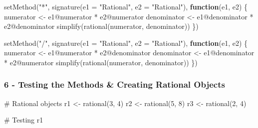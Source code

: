 \documentclass[
  12pt,
]{article}
\newenvironment{Shaded}{\begin{snugshade}}{\end{snugshade}}
\newcommand{\AttributeTok}[1]{\textcolor[rgb]{0.40,0.45,0.13}{#1}}
\newcommand{\CommentTok}[1]{\textcolor[rgb]{0.37,0.37,0.37}{#1}}
\newcommand{\ControlFlowTok}[1]{\textcolor[rgb]{0.00,0.23,0.31}{\textbf{#1}}}
\newcommand{\DecValTok}[1]{\textcolor[rgb]{0.68,0.00,0.00}{#1}}
\newcommand{\FunctionTok}[1]{\textcolor[rgb]{0.28,0.35,0.67}{#1}}
\newcommand{\NormalTok}[1]{\textcolor[rgb]{0.00,0.23,0.31}{#1}}
\newcommand{\OtherTok}[1]{\textcolor[rgb]{0.00,0.23,0.31}{#1}}
\newcommand{\SpecialCharTok}[1]{\textcolor[rgb]{0.37,0.37,0.37}{#1}}
\newcommand{\StringTok}[1]{\textcolor[rgb]{0.13,0.47,0.30}{#1}}
\begin{document}
\begin{Shaded}
\begin{Highlighting}[]
\FunctionTok{setMethod}\NormalTok{(}\StringTok{"*"}\NormalTok{, }\FunctionTok{signature}\NormalTok{(}\AttributeTok{e1 =} \StringTok{"Rational"}\NormalTok{, }\AttributeTok{e2 =} \StringTok{"Rational"}\NormalTok{), }\ControlFlowTok{function}\NormalTok{(e1, e2) \{}
\NormalTok{  numerator }\OtherTok{\textless{}{-}}\NormalTok{ e1}\SpecialCharTok{@}\NormalTok{numerator }\SpecialCharTok{*}\NormalTok{ e2}\SpecialCharTok{@}\NormalTok{numerator}
\NormalTok{  denominator }\OtherTok{\textless{}{-}}\NormalTok{ e1}\SpecialCharTok{@}\NormalTok{denominator }\SpecialCharTok{*}\NormalTok{ e2}\SpecialCharTok{@}\NormalTok{denominator}
  \FunctionTok{simplify}\NormalTok{(}\FunctionTok{rational}\NormalTok{(numerator, denominator))}
\NormalTok{\})}

\FunctionTok{setMethod}\NormalTok{(}\StringTok{"/"}\NormalTok{, }\FunctionTok{signature}\NormalTok{(}\AttributeTok{e1 =} \StringTok{"Rational"}\NormalTok{, }\AttributeTok{e2 =} \StringTok{"Rational"}\NormalTok{), }\ControlFlowTok{function}\NormalTok{(e1, e2) \{}
\NormalTok{  numerator }\OtherTok{\textless{}{-}}\NormalTok{ e1}\SpecialCharTok{@}\NormalTok{numerator }\SpecialCharTok{*}\NormalTok{ e2}\SpecialCharTok{@}\NormalTok{denominator}
\NormalTok{  denominator }\OtherTok{\textless{}{-}}\NormalTok{ e1}\SpecialCharTok{@}\NormalTok{denominator }\SpecialCharTok{*}\NormalTok{ e2}\SpecialCharTok{@}\NormalTok{numerator}
  \FunctionTok{simplify}\NormalTok{(}\FunctionTok{rational}\NormalTok{(numerator, denominator))}
\NormalTok{\})}
\end{Highlighting}
\end{Shaded}

\subsubsection{6 - Testing the Methods \& Creating Rational
Objects}\label{testing-the-methods-creating-rational-objects}

\begin{Shaded}
\begin{Highlighting}[]
\CommentTok{\# Rational objects}
\NormalTok{r1 }\OtherTok{\textless{}{-}} \FunctionTok{rational}\NormalTok{(}\DecValTok{3}\NormalTok{, }\DecValTok{4}\NormalTok{)}
\NormalTok{r2 }\OtherTok{\textless{}{-}} \FunctionTok{rational}\NormalTok{(}\DecValTok{5}\NormalTok{, }\DecValTok{8}\NormalTok{)}
\NormalTok{r3 }\OtherTok{\textless{}{-}} \FunctionTok{rational}\NormalTok{(}\DecValTok{2}\NormalTok{, }\DecValTok{4}\NormalTok{)}

\CommentTok{\# Testing}
\NormalTok{r1}
\end{Highlighting}
\end{Shaded}
\end{document}
